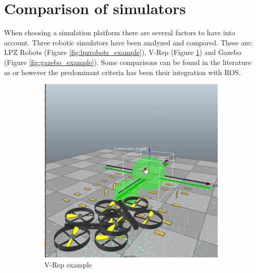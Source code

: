 \section{Comparison of simulators} %
\label{sec:sim_comparison_of_simulators}
When choosing a simulation platform there are several factors to have into account.
Three robotic simulators have been analyzed and compared. 
These are: LPZ Robots \cite{lpzrobots} (Figure \ref{fig:lpzrobots_example}), V-Rep \cite{vrep} (Figure \ref{fig:vrep_example}) and Gazebo \cite{gazebo} (Figure \ref{fig:gazebo_example}).
Some comparisons can be found in the literature as \cite{nogueiracomparative} or \cite{staranowicz2011survey} however the predominant criteria has been their integration with ROS.

\begin{figure}[hb!]
  \begin{subfigure}{.33\textwidth}
    \centering
    \includegraphics[width=.95\linewidth]{figures/vrep_example}
    \caption{V-Rep example}
    \label{fig:vrep_example}
  \end{subfigure}%
  \begin{subfigure}{.33\textwidth}
    \centering

\end{subfigure}
\end{figure}
